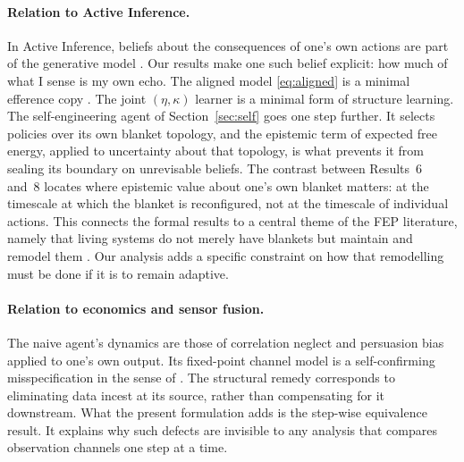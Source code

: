 \documentclass[11pt]{article}
\theoremstyle{definition}
\theoremstyle{remark}
\begin{document}
\paragraph{Relation to Active Inference.} In Active Inference, beliefs about the
consequences of one's own actions are part of the generative model
\citep{parr2022active,friston2015epistemic}. Our results make one such belief
explicit: how much of what I sense is my own echo. The aligned model
\eqref{eq:aligned} is a minimal efference copy \citep{vonholst1950}. The joint
$(\eta,\kappa)$ learner is a minimal form of structure learning. The
self-engineering agent of Section~\ref{sec:self} goes one step further. It
selects policies over its own blanket topology, and the epistemic term of
expected free energy, applied to uncertainty about that topology, is what
prevents it from sealing its boundary on unrevisable beliefs. The contrast
between Results~6 and~8 locates where epistemic value about one's own blanket
matters: at the timescale at which the blanket is reconfigured, not at the
timescale of individual actions. This connects the formal results to a central
theme of the FEP literature, namely that living systems do not merely have
blankets but maintain and remodel them
\citep{kirchhoff2018markov}. Our analysis adds a specific constraint on how
that remodelling must be done if it is to remain adaptive.

\paragraph{Relation to economics and sensor fusion.} The naive agent's dynamics
are those of correlation neglect \citep{enke2019} and persuasion bias
\citep{demarzo2003} applied to one's own output. Its fixed-point channel model
is a self-confirming misspecification in the sense of \citep{esponda2016}. The
structural remedy corresponds to eliminating data incest \citep{julier1997} at
its source, rather than compensating for it downstream. What the present
formulation adds is the step-wise equivalence result. It explains why such
defects are invisible to any analysis that compares observation channels one
step at a time.
\end{document}
